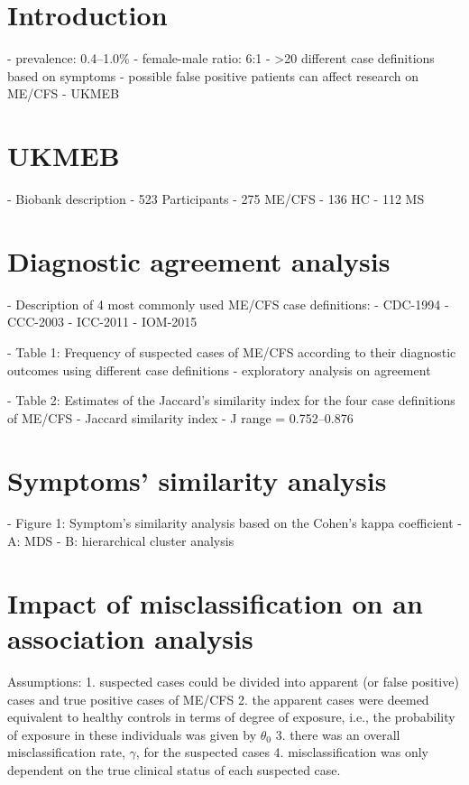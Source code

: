 \section{Introduction}

- prevalence: 0.4--1.0\%
- female-male ratio: 6:1
- >20 different case definitions based on symptoms
- possible false positive patients can affect research on ME/CFS
- UKMEB


\section{UKMEB}

- Biobank description
- 523 Participants
    - 275 ME/CFS
    - 136 HC
    - 112 MS


\section{Diagnostic agreement analysis}

- Description of 4 most commonly used ME/CFS case definitions:
    - CDC-1994
    - CCC-2003
    - ICC-2011
    - IOM-2015

- Table 1: Frequency of suspected cases of ME/CFS according to their diagnostic outcomes using different case definitions
    - exploratory analysis on agreement

- Table 2: Estimates of the Jaccard's similarity index for the four case definitions of ME/CFS
    - Jaccard similarity index
    - J range = 0.752--0.876


\section{Symptoms’ similarity analysis}

- Figure 1: Symptom's similarity analysis based on the Cohen's kappa coefficient
    - A: MDS
    - B: hierarchical cluster analysis


\section{Impact of misclassification on an association analysis}

Assumptions:
    1. suspected cases could be divided into apparent (or false positive) cases and true positive cases of ME/CFS
    2. the apparent cases were deemed equivalent to healthy controls in terms of degree of exposure, i.e., the probability of exposure in these individuals was given by $\theta_0$
    3. there was an overall misclassification rate, $\gamma$, for the suspected cases
    4. misclassification was only dependent on the true clinical status of each suspected case. 

